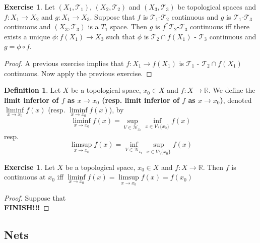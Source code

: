 \documentclass[12pt]{amsart}
\theoremstyle{definition}
\newtheorem{defn}[definition]{Definition}
\newtheorem{ex}[definition]{Exercise}
\newcommand{\R}{\mathbb{R}}
\newcommand{\MN}{\mathcal{N}}
\newcommand{\MT}{\mathcal{T}}
\newcommand{\tbf}[1]{\textbf{#1}}
\DeclareMathOperator*{\0}{\mbf{0}}
\DeclareMathOperator*{\1}{\mbf{1}}
\newcommand{\lex}[1]{\label{ex:#1}}
\begin{document}
	\begin{ex} \lex{}
	Let $(X_1, \MT_1)$, $(X_2, \MT_2)$ and $(X_3, \MT_3)$ be topological spaces and $f: X_1 \rightarrow X_2$ and $g:X_1 \rightarrow X_3$. Suppose that $f$ is $\MT_1$-$\MT_2$ continuous and $g$ is $\MT_1$-$\MT_3$ continuous and $(X_3, \MT_3)$ is a $T_1$ space. Then $g$ is $f^*\MT_2$-$\MT_3$ continuous iff there exists a unique $\phi: f(X_1) \rightarrow X_3$ such that $\phi$ is $\MT_2 \cap f(X_1)$ - $\MT_3$ continuous and $g = \phi \circ f$. \\
	\end{ex}
	
	\begin{proof}
	A previous exercise implies that $f: X_1 \rightarrow f(X_1)$ is $\MT_1$ - $\MT_2 \cap f(X_1)$ continuous. Now apply the previous exercise. 
	\end{proof}
	
	\begin{defn}
		Let $X$ be a topological space, $x_0 \in X$ and $f:X \rightarrow \R$. We define the \tbf{limit inferior of $f$ as $x \rightarrow x_0$ (resp. limit inferior of $f$ as $x \rightarrow x_0$)}, denoted $\liminf\limits_{x \rightarrow x_0}f(x)$ (resp. $\liminf\limits_{x \rightarrow x_0}f(x)$), by 
		$$\liminf_{x \rightarrow x_0} f(x) = \sup_{V \in \MN_{x_0}} \inf_{x \in V \setminus \{x_0\}} f(x)$$
		resp. 
		$$\limsup_{x \rightarrow x_0} f(x) = \inf_{V \in \MN_{x_0}} \sup_{x \in V \setminus \{x_0\}} f(x)$$
	\end{defn}

	\begin{ex}
		Let $X$ be a topological space, $x_0 \in X$ and $f:X \rightarrow \R$. Then $f$ is continuous at $x_0$ iff $\liminf\limits_{x \rightarrow x_0}f(x) = \limsup\limits_{x \rightarrow x_0}f(x) = f(x_0)$ 
	\end{ex}

	\begin{proof}
		Suppose that \\
		\tbf{FINISH!!!}
	\end{proof}














\newpage
\subsection{Nets}	
\end{document}
